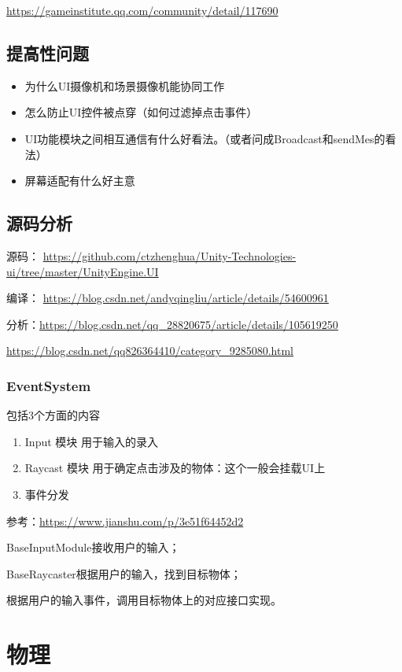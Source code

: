\documentclass[UTF8,a4paper,12pt]{ctexbook}
\begin{document}
			\url{https://gameinstitute.qq.com/community/detail/117690}
		
	\section{提高性问题}
		\begin{itemize}
			\item 为什么UI摄像机和场景摄像机能协同工作
			\item 怎么防止UI控件被点穿（如何过滤掉点击事件）
			\item UI功能模块之间相互通信有什么好看法。（或者问成Broadcast和sendMes的看法）
			\item 屏幕适配有什么好主意
		\end{itemize}
		
	
	\section{源码分析}
		源码： \url{https://github.com/ctzhenghua/Unity-Technologies-ui/tree/master/UnityEngine.UI}
	
		
		编译： \url{https://blog.csdn.net/andyqingliu/article/details/54600961}
		
		
		分析：\url{https://blog.csdn.net/qq_28820675/article/details/105619250}
			
		\url{https://blog.csdn.net/qq826364410/category_9285080.html}
		
		
		\subsection{EventSystem}包括3个方面的内容
			
			\begin{enumerate}
			\item Input 模块 用于输入的录入
			\item Raycast 模块 用于确定点击涉及的物体：这个一般会挂载UI上
			\item 事件分发
			\end{enumerate}
		
		
			参考：\url{https://www.jianshu.com/p/3e51f64452d2}
		
			BaseInputModule接收用户的输入；
			
			BaseRaycaster根据用户的输入，找到目标物体；
			
			根据用户的输入事件，调用目标物体上的对应接口实现。
		
			
		

		
\chapter{物理}
\end{document}
